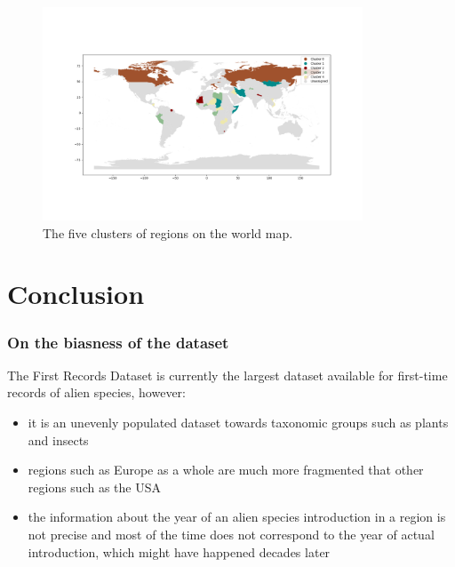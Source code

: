 \documentclass[
	11pt, %
]{beamer}
\begin{document}
\begin{frame}
\begin{figure}[ht]
    \centering
    \includegraphics[width=0.85\textwidth]{region_geospatial_cluster.png}
    \caption{The five clusters of regions on the world map.}
    \label{fig:worldmap_cluster}
\end{figure}
\end{frame}


\section{Conclusion}

\begin{frame}
\frametitle{On the biasness of the dataset}


The First Records Dataset is currently the largest dataset available for first-time records of alien species, however:

\begin{itemize}
\item it is  an unevenly populated dataset towards taxonomic groups such as plants and insects
\item regions such as Europe as a whole are much more fragmented that other regions such as the USA
\item the information about the year of an alien species introduction in a region is not precise and most of the time does not correspond to the year of actual introduction, which might have happened decades later
\end{itemize}
\end{frame}
\end{document}
